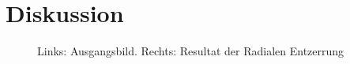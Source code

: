 \section{Diskussion}
\label{sec:Auswertung}
\begin{figure}[H]
	\caption{Links: Ausgangsbild. Rechts: Resultat der Radialen Entzerrung}
	\label{fig:Ergebnis}
\end{figure}

